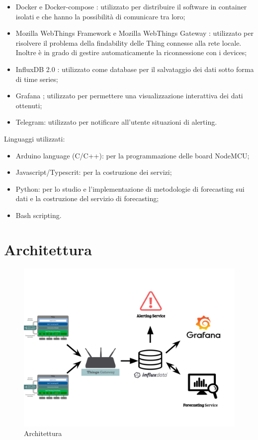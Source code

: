 \documentclass{article}
\begin{document}
\begin{itemize}
    \item Docker e Docker-compose \cite{docker}: utilizzato per distribuire il software in container isolati e che hanno la possibilità di comunicare tra loro;
    \item Mozilla WebThings Framework e Mozilla WebThings Gateway  \cite{mozillaiot}: utilizzato per risolvere il problema della findability delle Thing connesse alla rete locale. Inoltre è in grado di gestire automaticamente la riconnessione con i devices;
    \item InfluxDB 2.0 \cite{influx}: utilizzato come database per il salvataggio dei dati sotto forma di time series;
    \item Grafana \cite{grafana}; utilizzato per permettere una visualizzazione interattiva dei dati ottenuti;
    \item Telegram: utilizzato per notificare all'utente situazioni di alerting.
\end{itemize}

Linguaggi utilizzati:
\begin{itemize}
    \item Arduino language (C/C++): per la programmazione delle board NodeMCU;
    \item Javascript/Typescrit: per la costruzione dei servizi;
    \item Python: per lo studio e l'implementazione di metodologie di forecasting sui dati e la costruzione del servizio di forecasting;
    \item Bash scripting.
\end{itemize}

\section{Architettura}
\label{section:architettura}

\begin{figure} [!b]
    \centering
    \includegraphics[width=12cm]{img/arch.png}
    \caption{Architettura}
    \label{fig:arch}
\end{figure}
\end{document}
